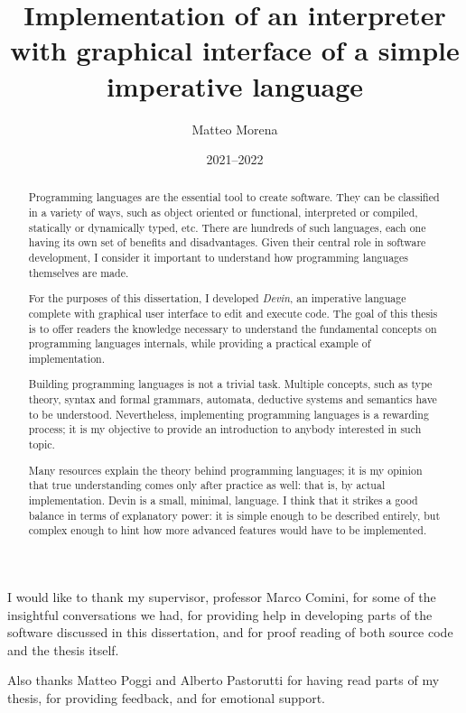 \documentclass[UdineBachThesis,american,11pt]{PhdThesis}
\author{Matteo Morena}
\date{2021--2022}
\title{
  Implementation of an interpreter with graphical interface of a simple
  imperative language
}
\begin{document}
  \pagestyle{empty}

  \maketitle

  \cleardoublepage


  \begin{abstract}
    Programming languages are the essential tool to create software. They can be
    classified in a variety of ways, such as object oriented or functional,
    interpreted or compiled, statically or dynamically typed, etc. There are
    hundreds of such languages, each one having its own set of benefits and
    disadvantages. Given their central role in software development, I consider
    it important to understand how programming languages themselves are made.

    For the purposes of this dissertation, I developed \emph{Devin}, an
    imperative language complete with graphical user interface to edit and
    execute code. The goal of this thesis is to offer readers the knowledge
    necessary to understand the fundamental concepts on programming languages
    internals, while providing a practical example of implementation.

    Building programming languages is not a trivial task. Multiple concepts,
    such as type theory, syntax and formal grammars, automata, deductive systems
    and semantics have to be understood. Nevertheless, implementing programming
    languages is a rewarding process; it is my objective to provide an
    introduction to anybody interested in such topic.

    Many resources explain the theory behind programming languages; it is my
    opinion that true understanding comes only after practice as well: that is,
    by actual implementation. Devin is a small, minimal, language. I think that
    it strikes a good balance in terms of explanatory power: it is simple enough
    to be described entirely, but complex enough to hint how more advanced
    features would have to be implemented.
  \end{abstract}


  \begin{acknowledgments}
    I would like to thank my supervisor, professor Marco Comini, for some of the
    insightful conversations we had, for providing help in developing parts of
    the software discussed in this dissertation, and for proof reading of both
    source code and the thesis itself.

    Also thanks Matteo Poggi and Alberto Pastorutti for having read parts of my
    thesis, for providing feedback, and for emotional support.
  \end{acknowledgments}
\end{document}
